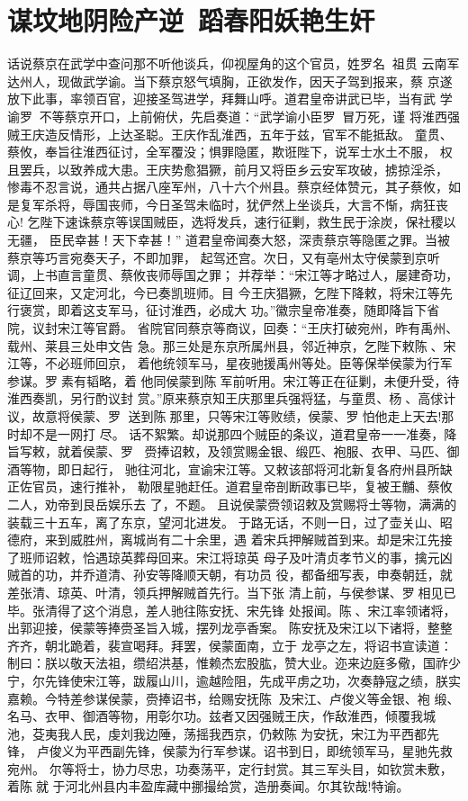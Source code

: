 \chapter{谋坟地阴险产逆~蹈春阳妖艳生奸}

话说蔡京在武学中查问那不听他谈兵，仰视屋角的这个官员，姓罗名，祖贯
云南军达州人，现做武学谕。当下蔡京怒气填胸，正欲发作，因天子驾到报来，蔡
京遂放下此事，率领百官，迎接圣驾进学，拜舞山呼。道君皇帝讲武已毕，当有武
学谕罗，不等蔡京开口，上前俯伏，先启奏道：“武学谕小臣罗，冒万死，谨
将淮西强贼王庆造反情形，上达圣聪。王庆作乱淮西，五年于兹，官军不能抵敌。
童贯、蔡攸，奉旨往淮西征讨，全军覆没；惧罪隐匿，欺诳陛下，说军士水土不服，
权且罢兵，以致养成大患。王庆势愈猖獗，前月又将臣乡云安军攻破，掳掠淫杀，
惨毒不忍言说，通共占据八座军州，八十六个州县。蔡京经体赞元，其子蔡攸，如
是复军杀将，辱国丧师，今日圣驾未临时，犹俨然上坐谈兵，大言不惭，病狂丧心!
乞陛下速诛蔡京等误国贼臣，选将发兵，速行征剿，救生民于涂炭，保社稷以无疆，
臣民幸甚！天下幸甚！”
道君皇帝闻奏大怒，深责蔡京等隐匿之罪。当被蔡京等巧言宛奏天子，不即加罪，
起驾还宫。次日，又有亳州太守侯蒙到京听调，上书直言童贯、蔡攸丧师辱国之罪；
并荐举：“宋江等才略过人，屡建奇功，征辽回来，又定河北，今已奏凯班师。目
今王庆猖獗，乞陛下降敕，将宋江等先行褒赏，即着这支军马，征讨淮西，必成大
功。”徽宗皇帝准奏，随即降旨下省院，议封宋江等官爵。
省院官同蔡京等商议，回奏：“王庆打破宛州，昨有禹州、载州、莱县三处申文告
急。那三处是东京所属州县，邻近神京，乞陛下敕陈、宋江等，不必班师回京，
着他统领军马，星夜驰援禹州等处。臣等保举侯蒙为行军参谋。罗素有韬略，着
他同侯蒙到陈军前听用。宋江等正在征剿，未便升受，待淮西奏凯，另行酌议封
赏。”原来蔡京知王庆那里兵强将猛，与童贯、杨、高俅计议，故意将侯蒙、罗
送到陈那里，只等宋江等败绩，侯蒙、罗怕他走上天去!那时却不是一网打
尽。
话不絮繁。却说那四个贼臣的条议，道君皇帝一一准奏，降旨写敕，就着侯蒙、罗
，赍捧诏敕，及领赏赐金银、缎匹、袍服、衣甲、马匹、御酒等物，即日起行，
驰往河北，宣谕宋江等。又敕该部将河北新复各府州县所缺正佐官员，速行推补，
勒限星驰赶任。道君皇帝剖断政事已毕，复被王黼、蔡攸二人，劝帝到艮岳娱乐去
了，不题。
且说侯蒙赍领诏敕及赏赐将士等物，满满的装载三十五车，离了东京，望河北进发。
于路无话，不则一日，过了壶关山、昭德府，来到威胜州，离城尚有二十余里，遇
着宋兵押解贼首到来。却是宋江先接了班师诏敕，恰遇琼英葬母回来。宋江将琼英
母子及叶清贞孝节义的事，擒元凶贼首的功，并乔道清、孙安等降顺天朝，有功员
役，都备细写表，申奏朝廷，就差张清、琼英、叶清，领兵押解贼首先行。当下张
清上前，与侯参谋、罗相见已毕。张清得了这个消息，差人驰往陈安抚、宋先锋
处报闻。陈、宋江率领诸将，出郭迎接，侯蒙等捧赍圣旨入城，摆列龙亭香案。
陈安抚及宋江以下诸将，整整齐齐，朝北跪着，裴宣喝拜。拜罢，侯蒙面南，立于
龙亭之左，将诏书宣读道：
制曰：朕以敬天法祖，缵绍洪基，惟赖杰宏股肱，赞大业。迩来边庭多儆，国祚少
宁，尔先锋使宋江等，跋履山川，逾越险阻，先成平虏之功，次奏静寇之绩，朕实
嘉赖。今特差参谋侯蒙，赍捧诏书，给赐安抚陈，及宋江、卢俊义等金银、袍
缎、名马、衣甲、御酒等物，用彰尔功。兹者又因强贼王庆，作敌淮西，倾覆我城
池，芟夷我人民，虔刘我边陲，荡摇我西京，仍敕陈为安抚，宋江为平西都先锋，
卢俊义为平西副先锋，侯蒙为行军参谋。诏书到日，即统领军马，星驰先救宛州。
尔等将士，协力尽忠，功奏荡平，定行封赏。其三军头目，如钦赏未敷，着陈就
于河北州县内丰盈库藏中挪撮给赏，造册奏闻。尔其钦哉!特谕。


